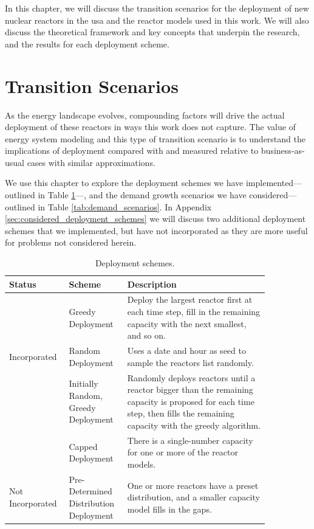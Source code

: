 In this chapter, we will discuss the transition scenarios for the deployment of new nuclear reactors in the \gls{usa} and the reactor models used in this work. We will also discuss the theoretical framework and key concepts that underpin the research, and the results for each deployment scheme.

\section{Transition Scenarios}
\label{sec:transition_scenarios}

As the energy landscape evolves, compounding
factors will drive the actual deployment of these reactors in ways this work
does not capture. The value of energy system modeling and this type of
transition scenario is to understand the implications of deployment compared
with and measured relative to business-as-usual cases with similar
approximations.

We use this chapter to explore the deployment schemes we have
implemented---outlined in Table \ref{tab:deployment_schemes}---, and the demand
growth scenarios we have considered---outlined in Table
\ref{tab:demand_scenarios}. In Appendix \ref{sec:considered_deployment_schemes}
we will discuss two additional deployment schemes that we implemented, but
have not incorporated as they are more useful for problems not considered herein.

\begin{table}[H]
    \centering
    \caption{Deployment schemes.}
    \label{tab:deployment_schemes}
    \begin{tabular}{p{0.15\linewidth} >{\raggedright}p{0.20\linewidth}>{\raggedright\arraybackslash}p{0.50\linewidth}}
        \hline
        Status & Scheme & Description \\
        \hline
         & Greedy Deployment & Deploy the largest
        reactor first at each time step, fill in the remaining capacity with
        the next smallest, and so on. \\
        Incorporated & Random Deployment & Uses a date and hour as seed to sample the
        reactors list randomly. \\
        & Initially Random, Greedy Deployment & Randomly deploys reactors until
        a reactor bigger than the remaining capacity is proposed for each time step,
        then fills the remaining capacity with the greedy algorithm. \\
        \hline
         & Capped Deployment & There is a
        single-number capacity for one or more of the reactor models. \\
        Not Incorporated & Pre-Determined Distribution Deployment & One or more reactors have a
        preset distribution, and a smaller capacity model fills in the gaps. \\
        \hline
    \end{tabular}
\end{table}

